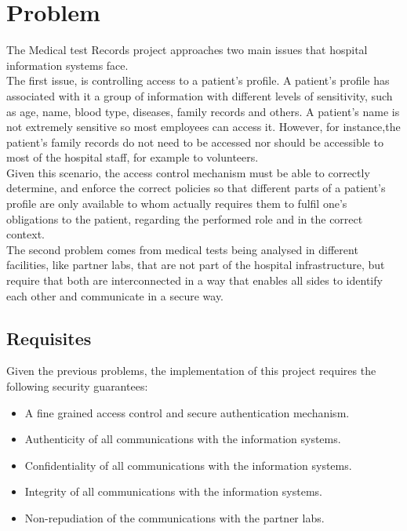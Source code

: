 \section{Problem}

The Medical test Records project approaches two main issues that hospital information systems face. \\

The first issue, is controlling access to a patient's profile.
A patient's profile has associated with it a group of information with different levels of sensitivity, such as age, name, blood type, diseases, family records and others.
A patient's name is not extremely sensitive so most employees can access it. However, for instance,the patient's family records do not need to be accessed nor should be accessible to most of the hospital staff, for example to volunteers. \\

Given this scenario, the access control mechanism must be able to correctly determine, and enforce the correct policies so that different parts of a patient's profile are only available to whom actually requires them to fulfil one's obligations to the patient, regarding the performed role and in the correct context. \\

The second problem comes from medical tests being analysed in different facilities, like partner labs, that are not part of the hospital infrastructure, but require that both are interconnected in a way that enables all sides to identify each other and communicate in a secure way. \\

\subsection{Requisites}

Given the previous problems, the implementation of this project requires the following security guarantees:
\begin{itemize}
	\item A fine grained access control and secure authentication mechanism.
	\item Authenticity of all communications with the information systems.
	\item Confidentiality of all communications with the information systems.
	\item Integrity of all communications with the information systems.
	\item Non-repudiation of the communications with the partner labs.
\end{itemize}

